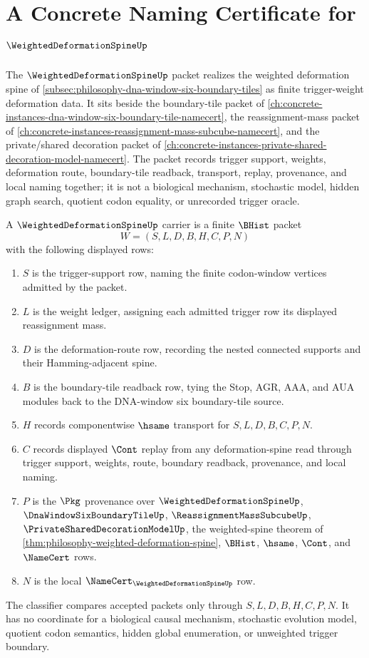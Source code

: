 \chapter{A Concrete Naming Certificate for $\WeightedDeformationSpineUp$}
\label{ch:concrete-instances-weighted-deformation-spine-namecert}

The $\WeightedDeformationSpineUp$ packet realizes the weighted deformation spine of \autoref{subsec:philosophy-dna-window-six-boundary-tiles} as finite trigger-weight deformation data. It sits beside the boundary-tile packet of \autoref{ch:concrete-instances-dna-window-six-boundary-tile-namecert}, the reassignment-mass packet of \autoref{ch:concrete-instances-reassignment-mass-subcube-namecert}, and the private/shared decoration packet of \autoref{ch:concrete-instances-private-shared-decoration-model-namecert}. The packet records trigger support, weights, deformation route, boundary-tile readback, transport, replay, provenance, and local naming together; it is not a biological mechanism, stochastic model, hidden graph search, quotient codon equality, or unrecorded trigger oracle.

\begin{definition}
\label{def:weighted-deformation-operator-carrier}
A $\WeightedDeformationSpineUp$ carrier is a finite $\BHist$ packet
$$
W=(S,L,D,B,H,C,P,N)
$$
with the following displayed rows:
\begin{enumerate}
\item $S$ is the trigger-support row, naming the finite codon-window vertices admitted by the packet.
\item $L$ is the weight ledger, assigning each admitted trigger row its displayed reassignment mass.
\item $D$ is the deformation-route row, recording the nested connected supports and their Hamming-adjacent spine.
\item $B$ is the boundary-tile readback row, tying the Stop, AGR, AAA, and AUA modules back to the DNA-window six boundary-tile source.
\item $H$ records componentwise $\hsame$ transport for $S,L,D,B,C,P,N$.
\item $C$ records displayed $\Cont$ replay from any deformation-spine read through trigger support, weights, route, boundary readback, provenance, and local naming.
\item $P$ is the $\Pkg$ provenance over $\WeightedDeformationSpineUp$, $\DnaWindowSixBoundaryTileUp$, $\ReassignmentMassSubcubeUp$, $\PrivateSharedDecorationModelUp$, the weighted-spine theorem of \autoref{thm:philosophy-weighted-deformation-spine}, $\BHist$, $\hsame$, $\Cont$, and $\NameCert$ rows.
\item $N$ is the local $\NameCert_{\WeightedDeformationSpineUp}$ row.
\end{enumerate}
The classifier compares accepted packets only through $S,L,D,B,H,C,P,N$. It has no coordinate for a biological causal mechanism, stochastic evolution model, quotient codon semantics, hidden global enumeration, or unweighted trigger boundary.
\end{definition}

